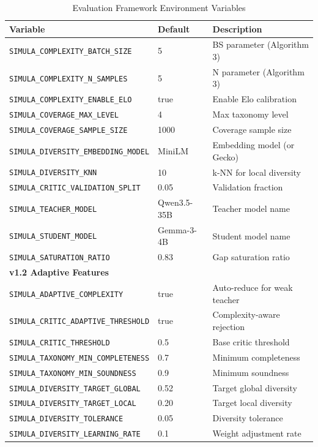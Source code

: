 \documentclass[12pt,a4paper,twoside]{report}
\begin{document}
\begin{table}[H]
\centering
\caption{Evaluation Framework Environment Variables}
\label{tab:eval-env}
\begin{tabularx}{\textwidth}{lp{2cm}X}
\toprule
\textbf{Variable} & \textbf{Default} & \textbf{Description} \\
\midrule
\texttt{SIMULA\_COMPLEXITY\_BATCH\_SIZE} & 5 & BS parameter (Algorithm 3) \\
\texttt{SIMULA\_COMPLEXITY\_N\_SAMPLES} & 5 & N parameter (Algorithm 3) \\
\texttt{SIMULA\_COMPLEXITY\_ENABLE\_ELO} & true & Enable Elo calibration \\
\texttt{SIMULA\_COVERAGE\_MAX\_LEVEL} & 4 & Max taxonomy level \\
\texttt{SIMULA\_COVERAGE\_SAMPLE\_SIZE} & 1000 & Coverage sample size \\
\texttt{SIMULA\_DIVERSITY\_EMBEDDING\_MODEL} & MiniLM & Embedding model (or Gecko) \\
\texttt{SIMULA\_DIVERSITY\_KNN} & 10 & k-NN for local diversity \\
\texttt{SIMULA\_CRITIC\_VALIDATION\_SPLIT} & 0.05 & Validation fraction \\
\texttt{SIMULA\_TEACHER\_MODEL} & Qwen3.5-35B & Teacher model name \\
\texttt{SIMULA\_STUDENT\_MODEL} & Gemma-3-4B & Student model name \\
\texttt{SIMULA\_SATURATION\_RATIO} & 0.83 & Gap saturation ratio \\
\midrule
\multicolumn{3}{l}{\textbf{v1.2 Adaptive Features}} \\
\midrule
\texttt{SIMULA\_ADAPTIVE\_COMPLEXITY} & true & Auto-reduce for weak teacher \\
\texttt{SIMULA\_CRITIC\_ADAPTIVE\_THRESHOLD} & true & Complexity-aware rejection \\
\texttt{SIMULA\_CRITIC\_THRESHOLD} & 0.5 & Base critic threshold \\
\texttt{SIMULA\_TAXONOMY\_MIN\_COMPLETENESS} & 0.7 & Minimum completeness \\
\texttt{SIMULA\_TAXONOMY\_MIN\_SOUNDNESS} & 0.9 & Minimum soundness \\
\texttt{SIMULA\_DIVERSITY\_TARGET\_GLOBAL} & 0.52 & Target global diversity \\
\texttt{SIMULA\_DIVERSITY\_TARGET\_LOCAL} & 0.20 & Target local diversity \\
\texttt{SIMULA\_DIVERSITY\_TOLERANCE} & 0.05 & Diversity tolerance \\
\texttt{SIMULA\_DIVERSITY\_LEARNING\_RATE} & 0.1 & Weight adjustment rate \\
\bottomrule
\end{tabularx}
\end{table}
\end{document}
